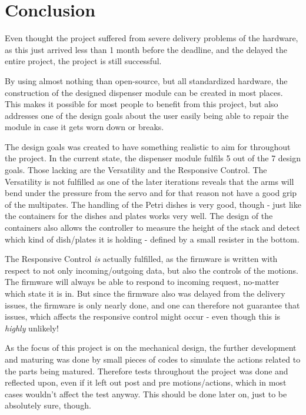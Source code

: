 \documentclass[10pt,a4paper]{article}
\begin{document}
				

		
	\section{Conclusion}
	Even thought the project suffered from severe delivery problems of the hardware, as this just arrived less than 1 month before the deadline, and the delayed the entire project, the project is still successful.
	
	By using almost nothing than open-source, but all standardized hardware, the construction of the designed dispenser module can be created in most places. This makes it possible for most people to benefit from this project, but also addresses one of the design goals about the user easily being able to repair the module in case it gets worn down or breaks.
	
	The design goals was created to have something realistic to aim for throughout the project. In the current state, the dispenser module fulfils 5 out of the 7 design goals. Those lacking are the Versatility and the Responsive Control. The Versatility is not fulfilled as one of the later iterations reveals that the arms will bend under the pressure from the servo and for that reason not have a good grip of the multipates. The handling of the Petri dishes is very good, though - just like the containers for the dishes and plates works very well. The design of the containers also allows the controller to measure the height of the stack and detect which kind of dish/plates it is holding - defined by a small resister in the bottom.
	
	The Responsive Control \textit{is} actually fulfilled, as the firmware is written with respect to not only incoming/outgoing data, but also the controls of the motions. The firmware will always be able to respond to incoming request, no-matter which state it is in. But since the firmware also was delayed from the delivery issues, the firmware is only nearly done, and one can therefore not guarantee that issues, which affects the responsive control might occur - even though this is \textit{highly} unlikely!
	
	As the focus of this project is on the mechanical design, the further development and maturing was done by small pieces of codes to simulate the actions related to the parts being matured. Therefore tests throughout the project was done and reflected upon, even if it left out post and pre motions/actions, which in most cases wouldn't affect the test anyway. This should be done later on, just to be absolutely sure, though.
	
\end{document}
